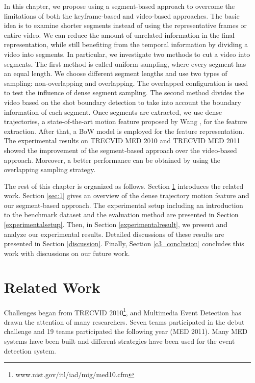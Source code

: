 In this chapter, we propose using a segment-based approach to overcome the limitations of both the keyframe-based and video-based approaches. The basic idea is to examine shorter segments instead of using the representative frames or entire video. We can reduce the amount of unrelated information in the final representation, while still benefiting from the temporal information by dividing a video into segments. In particular, we investigate two methods to cut a video into segments. The first method is called uniform sampling, where every segment has an equal length. We choose different segment lengths and use two types of sampling: non-overlapping and overlapping. The overlapped configuration is used to test the influence of dense segment sampling. The second method divides the video based on the shot boundary detection to take into account the boundary information of each segment. Once segments are extracted, we use dense trajectories, a state-of-the-art motion feature proposed by Wang \cite{wang:2011:inria-00583818:1}, for the feature extraction. After that, a BoW model is employed for the feature representation. The experimental results on TRECVID MED 2010 and TRECVID MED 2011 showed the improvement of the segment-based approach over the video-based approach. Moreover, a better performance can be obtained by using the overlapping sampling strategy. 

The rest of this chapter is organized as follows. Section \ref{relatedwork:1} introduces the related work. Section \ref{sec:1} gives an overview of the dense trajectory motion feature and our segment-based approach. The experimental setup including an introduction to the benchmark dataset and the evaluation method are presented in Section \ref{experimentalsetup}. Then, in Section \ref{experimentalresult}, we present and analyze our experimental results. Detailed discussions of these results are presented in Section \ref{discussion}. Finally, Section \ref{c3_conclusion} concludes this work with discussions on our future work. 

\section{Related Work}
\label{relatedwork:1}
Challenges began from TRECVID 2010\footnote{www.nist.gov/itl/iad/mig/med10.cfm}, and Multimedia Event Detection has drawn the attention of many researchers. Seven teams participated in the debut challenge and 19 teams participated the following year (MED 2011). Many MED systems have been built and different strategies have been used for the event detection system.

